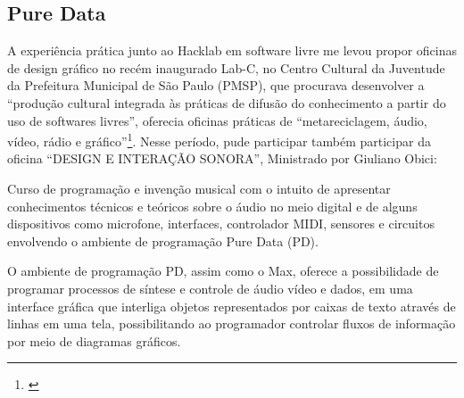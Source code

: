 \subsection{Pure Data}


A experiência prática junto ao Hacklab em software livre me levou propor oficinas de design gráfico no recém inaugurado Lab-C, no Centro Cultural da Juventude da Prefeitura Municipal de São Paulo (PMSP), que procurava desenvolver a ``produção cultural integrada às práticas de difusão do conhecimento a partir do uso de softwares livres'', oferecia oficinas práticas de ``metareciclagem, áudio, vídeo, rádio e gráfico''\footnote{\cite{PMSP2008}}. Nesse período, pude participar também participar da oficina ``DESIGN E INTERAÇÃO SONORA'', Ministrado por Giuliano Obici:
\begin{citacao}
Curso de programação e invenção musical com o intuito de apresentar conhecimentos técnicos e teóricos sobre o áudio no meio digital e de alguns dispositivos como microfone, interfaces, controlador MIDI, sensores e circuitos envolvendo o ambiente de programação Pure Data (PD).\cite{PMSP2008}
\end{citacao}

O ambiente de programação PD, assim como o Max, oferece a possibilidade de programar processos de síntese e controle de áudio vídeo e dados, em uma interface gráfica que interliga objetos representados por caixas de texto através de linhas em uma tela, possibilitando ao programador controlar fluxos de informação por meio de diagramas gráficos. 

